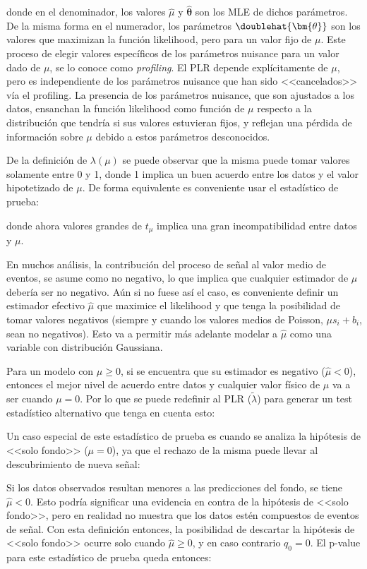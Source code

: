 donde en el denominador, los valores $\hat{\mu}$ y $\hat{\bm{\theta}}$ son los MLE de dichos parámetros. De la misma forma en el numerador, los
parámetros $\doublehat{\bm{\theta}}$ son los valores que maximizan la función likelihood, pero para un valor fijo de $\mu$. Este proceso de elegir valores específicos de los parámetros nuisance para un valor dado de $\mu$, se lo conoce como \textit{profiling}. El PLR depende explícitamente de $\mu$, pero es independiente de los parámetros nuisance que han sido <<cancelados>>
vía el profiling. La presencia de los parámetros nuisance, que son ajustados a los datos, ensanchan la función likelihood como función de $\mu$ respecto a la distribución que tendría si sus valores estuvieran fijos, y reflejan una pérdida de información sobre $\mu$ debido a estos parámetros desconocidos.


De la definición de $\lambda(\mu)$ se puede observar que la misma puede tomar valores solamente entre 0 y 1, donde 1 implica un buen acuerdo entre los datos y el valor hipotetizado de $\mu$. De forma equivalente es conveniente usar el estadístico de prueba:


donde ahora valores grandes de $t_{\mu}$ implica una gran incompatibilidad entre datos y $\mu$.


En muchos análisis, la contribución del proceso de señal al valor medio de eventos, se asume como no negativo, lo que implica que cualquier estimador de 
$\mu$ debería ser no negativo. Aún si no fuese así el caso, es conveniente definir un estimador efectivo $\hat{\mu}$ que maximice el likelihood y que tenga la posibilidad de tomar valores negativos (siempre y cuando los valores medios de Poisson, $\mu s_i + b_i$, sean no negativos). Esto va a permitir más adelante modelar a $\hat{\mu}$ como una variable con distribución Gaussiana. 

Para un modelo con $\mu\ge0$, si se encuentra que su estimador es negativo ($\hat{\mu}<0$), entonces el mejor nivel de acuerdo entre datos y cualquier valor físico de $\mu$ va a ser cuando $\mu=0$. Por lo que se puede redefinir al PLR ($\tilde{\lambda}$) para generar un test estadístico alternativo que tenga en cuenta esto:


Un caso especial de este estadístico de prueba es cuando se analiza la hipótesis de <<solo fondo>> ($\mu=0$), ya que el rechazo de la misma puede llevar al descubrimiento de nueva señal:

Si los datos observados resultan menores a las predicciones del fondo, se tiene $\hat{\mu}<0$. Esto podría significar una evidencia en contra de la hipótesis de <<solo fondo>>, pero en realidad no muestra que los datos estén compuestos de eventos de señal. Con esta definición entonces, la posibilidad de descartar la hipótesis de <<solo fondo>> ocurre solo cuando $\hat{\mu}\ge0$, y en caso contrario $q_{0}=0$. El p-value para este estadístico de prueba queda entonces:


